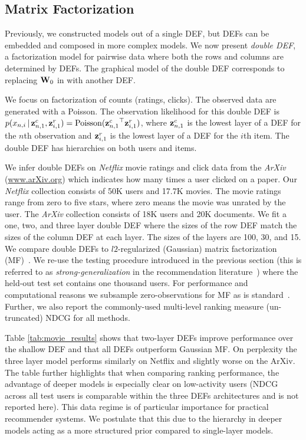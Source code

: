 \documentclass[twoside]{article}
\begin{document}
\subsection{Matrix Factorization}
Previously, we constructed models out of a single DEF, but DEFs can be
embedded and composed in more complex models. We now present \emph{double
DEF}, a factorization model for pairwise data where both the rows and
columns are determined by DEFs.	The graphical model of the double DEF
corresponds to replacing $\boldsymbol{\mathbf{W}}_{0}$ in  with another DEF.

We focus on factorization of counts (ratings, clicks). The observed data
are generated with a Poisson.
The observation likelihood for this double DEF is $p(x_{n,i} \,\vert\, \boldsymbol{\mathbf{z}}_{n, 1}^c, \boldsymbol{\mathbf{z}}_{i, 1}^r) =
 \textrm{Poisson}({\boldsymbol{\mathbf{z}}_{n, 1}^c}^\top {\ensuremath{\boldsymbol{\mathbf{z}}}_{i, 1}^r})$,
where $\boldsymbol{\mathbf{z}}_{n, 1}^c$ is the lowest layer of a DEF for the $n$th
observation and $\boldsymbol{\mathbf{z}}_{i, 1}^r$ is the lowest layer of a DEF for
the $i$th item. 
The double DEF has hierarchies on both users and items.

We infer double DEFs on \emph{Netflix} movie ratings and click data from the
\emph{ArXiv} ({\small\url{www.arXiv.org}}) which indicates
how many times a user clicked on a paper.  Our \emph{Netflix} collection
consists of 50K users and 17.7K movies.
The movie ratings range from zero to five stars, where zero means the movie was unrated by the user.
The \emph{ArXiv} collection consists of 18K users and 20K documents.
We fit a one, two, and three layer double DEF where the sizes of the row DEF match the 
sizes of the column DEF at each layer. The sizes of the layers are 100,
30, and 15. We compare double DEFs to $l2$-regularized (Gaussian) matrix
factorization (MF)~\citep{Salakhutdinov:2008a}.  We re-use the testing procedure
introduced in the previous section (this is referred to as
\textit{strong-generalization} in the recommendation
literature~\citep{Marlin:04}) where the held-out test set contains one thousand
users. For performance and computational reasons we subsample
zero-observations for MF as is standard~\cite{Gopalan:2013}.  
Further, we also report the commonly-used multi-level ranking
measure (un-truncated) NDCG \citep{Jarvelin:2000} for all methods. 

Table \ref{tab:movie_results} shows that two-layer DEFs improve performance
over the shallow DEF and that all DEFs outperform Gaussian MF. On perplexity the three layer
model performs similarly on Netflix and slightly worse on the ArXiv.
The table further highlights that when comparing ranking performance, the
advantage of deeper models is especially clear on low-activity users (NDCG across all
test users is comparable within the three DEFs architectures and is not
reported here). This data regime is of particular importance for practical
recommender systems.  We postulate that this due to the hierarchy in deeper
models acting as a more structured prior compared to single-layer models.
\end{document}
